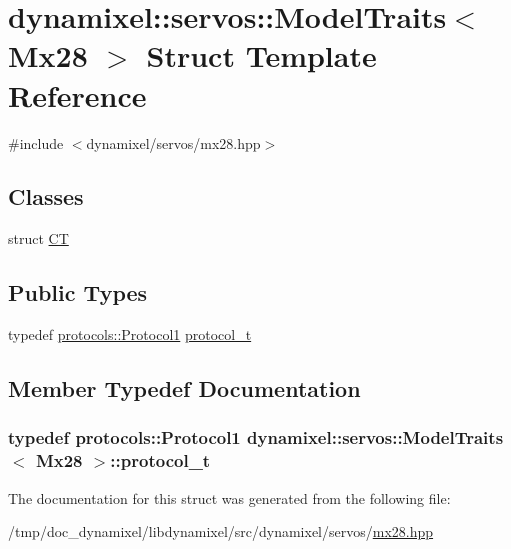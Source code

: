 \hypertarget{structdynamixel_1_1servos_1_1_model_traits_3_01_mx28_01_4}{}\section{dynamixel\+:\+:servos\+:\+:Model\+Traits$<$ Mx28 $>$ Struct Template Reference}
\label{structdynamixel_1_1servos_1_1_model_traits_3_01_mx28_01_4}


{\ttfamily \#include $<$dynamixel/servos/mx28.\+hpp$>$}

\subsection*{Classes}
\begin{DoxyCompactItemize}
\item 
struct \hyperlink{structdynamixel_1_1servos_1_1_model_traits_3_01_mx28_01_4_1_1_c_t}{C\+T}
\end{DoxyCompactItemize}
\subsection*{Public Types}
\begin{DoxyCompactItemize}
\item 
typedef \hyperlink{classdynamixel_1_1protocols_1_1_protocol1}{protocols\+::\+Protocol1} \hyperlink{structdynamixel_1_1servos_1_1_model_traits_3_01_mx28_01_4_a15e6e7bed6719eb419a94df31b019677}{protocol\+\_\+t}
\end{DoxyCompactItemize}


\subsection{Member Typedef Documentation}
\hypertarget{structdynamixel_1_1servos_1_1_model_traits_3_01_mx28_01_4_a15e6e7bed6719eb419a94df31b019677}{}
\subsubsection[{protocol\+\_\+t}]{\setlength{\rightskip}{0pt plus 5cm}typedef {\bf protocols\+::\+Protocol1} {\bf dynamixel\+::servos\+::\+Model\+Traits}$<$ {\bf Mx28} $>$\+::{\bf protocol\+\_\+t}}\label{structdynamixel_1_1servos_1_1_model_traits_3_01_mx28_01_4_a15e6e7bed6719eb419a94df31b019677}


The documentation for this struct was generated from the following file\+:\begin{DoxyCompactItemize}
\item 
/tmp/doc\+\_\+dynamixel/libdynamixel/src/dynamixel/servos/\hyperlink{mx28_8hpp}{mx28.\+hpp}\end{DoxyCompactItemize}
